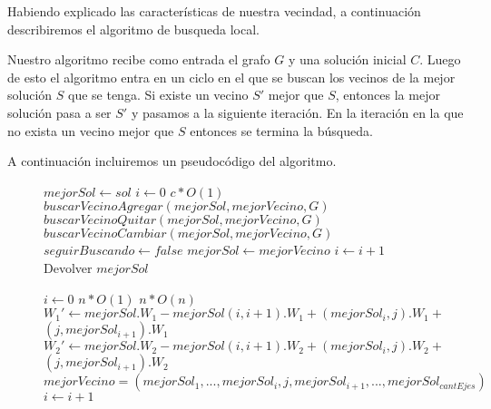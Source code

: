 Habiendo explicado las características de nuestra vecindad, a continuación describiremos el algoritmo de busqueda local.

Nuestro algoritmo recibe como entrada el grafo $G$ y una solución inicial $C$. Luego de esto el algoritmo entra en un ciclo en el que se buscan los vecinos de la mejor solución $S$ que se tenga. Si existe un vecino $S'$ mejor que $S$, entonces la mejor solución pasa a ser $S'$ y pasamos a la siguiente iteración. En la iteración en la que no exista un vecino mejor que $S$ entonces se termina la búsqueda.

A continuación incluiremos un pseudocódigo del algoritmo.
\begin{center}
 \begin{figure}[H]
  \begin{pseudo}
   \State $mejorSol \leftarrow sol$
   \State $i \leftarrow 0$
   \hfill$c*O(1)$
      \State $buscarVecinoAgregar(mejorSol, mejorVecino, G)$
      \State $buscarVecinoQuitar(mejorSol, mejorVecino, G)$
      \State $buscarVecinoCambiar(mejorSol, mejorVecino, G)$
	\State $seguirBuscando \leftarrow false$
      \Else
	\State $mejorSol \leftarrow mejorVecino$
      \EndIf
      \State $i \leftarrow i+1$
   \EndWhile
   \State Devolver $mejorSol$
   \EndProcedure
  \end{pseudo}
 \end{figure}
\end{center}

\begin{flushleft}
 \begin{figure}[H]
  \begin{pseudo}
   \State $i \leftarrow 0$
   \hfill$n*O(1)$
      \hfill$n*O(n)$
	  \State $W_1' \leftarrow mejorSol.W_1 - mejorSol(i,i+1).W_1 + (mejorSol_i,j).W_1 + $
	  \State $(j,mejorSol_{i+1}).W_1$
	  \State $W_2' \leftarrow mejorSol.W_2 - mejorSol(i,i+1).W_2 + (mejorSol_i,j).W_2 + $
	  \State $(j,mejorSol_{i+1}).W_2$
	    \State $mejorVecino = (mejorSol_1, ... ,mejorSol_i, j, mejorSol_{i+1}, ..., mejorSol_{cantEjes})$
	  \EndIf
      \EndFor
      \State $i \leftarrow i+1$
   \EndWhile
   \EndProcedure
  \end{pseudo}
 \end{figure}
\end{flushleft}

